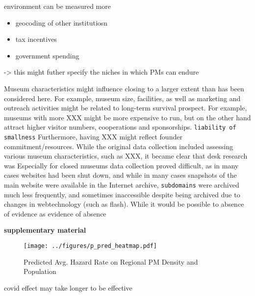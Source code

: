 \documentclass[12pt]{article}
\begin{document}
environment can be measured more
\begin{itemize}
\item geocoding of other institutiosn
\item tax incentives
\item government spending
\end{itemize}
-> this might futher specify the niches in which PMs can endure


Museum characteristics might influence closing to a larger extent than has been considered here.
For example, museum size, facilities, as well as marketing and outreach activities might be related to long-term survival prospect.
For example, museums with more XXX might be more expensive to run, but on the other hand attract higher visitor numbers, cooperations and sponsorships. \texttt{liability of smallness}
Furthermore, having XXX might reflect founder commitment/resources.
While the original data collection included assessing various museum characteristics, such as XXX, it became clear that desk research was
Especially for closed museums data collection proved difficult, as in many cases websites had been shut down, and while in many cases snapshots of the main website were available in the Internet archive, \texttt{subdomains} were archived much less frequently, and sometimes inaccessible despite being archived due to changes in webtechnology (such as flash).
While it would be possible to
absence of evidence as evidence of absence

\textbf{supplementary material}





\begin{figure}[htbp]
\centering
\texttt{[image: ../figures/p\_pred\_heatmap.pdf]}
\caption{\label{fig:p_pred_heatmap}Predicted Avg. Hazard Rate on Regional PM Density and Population}
\end{figure}



covid effect may take longer to be effective
\end{document}
